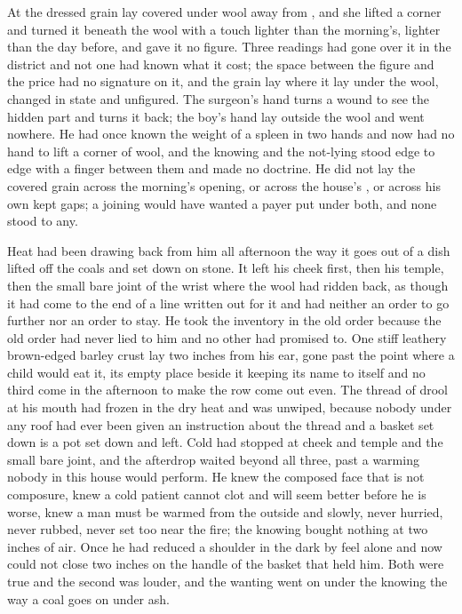 At  the dressed grain lay covered under wool away from , and she lifted a corner and turned it beneath the wool with a touch lighter than the morning's, lighter than the day before, and gave it no figure. Three readings had gone over it in the district and not one had known what it cost; the space between the figure and the price had no signature on it, and the grain lay where it lay under the wool, changed in state and unfigured. The surgeon's hand turns a wound to see the hidden part and turns it back; the boy's hand lay outside the wool and went nowhere. He had once known the weight of a spleen in two hands and now had no hand to lift a corner of wool, and the knowing and the not-lying stood edge to edge with a finger between them and made no doctrine. He did not lay the covered grain across the morning's opening, or across the house's , or across his own kept gaps; a joining would have wanted a payer put under both, and none stood to any.

Heat had been drawing back from him all afternoon the way it goes out of a dish lifted off the coals and set down on stone. It left his cheek first, then his temple, then the small bare joint of the wrist where the wool had ridden back, as though it had come to the end of a line written out for it and had neither an order to go further nor an order to stay. He took the inventory in the old order because the old order had never lied to him and no other had promised to. One stiff leathery brown-edged barley crust lay two inches from his ear, gone past the point where a child would eat it, its empty place beside it keeping its name to itself and no third come in the afternoon to make the row come out even. The thread of drool at his mouth had frozen in the dry heat and was unwiped, because nobody under any roof had ever been given an instruction about the thread and a basket set down is a pot set down and left. Cold had stopped at cheek and temple and the small bare joint, and the afterdrop waited beyond all three, past a warming nobody in this house would perform. He knew the composed face that is not composure, knew a cold patient cannot clot and will seem better before he is worse, knew a man must be warmed from the outside and slowly, never hurried, never rubbed, never set too near the fire; the knowing bought nothing at two inches of air. Once he had reduced a shoulder in the dark by feel alone and now could not close two inches on the handle of the basket that held him. Both were true and the second was louder, and the wanting went on under the knowing the way a coal goes on under ash.

